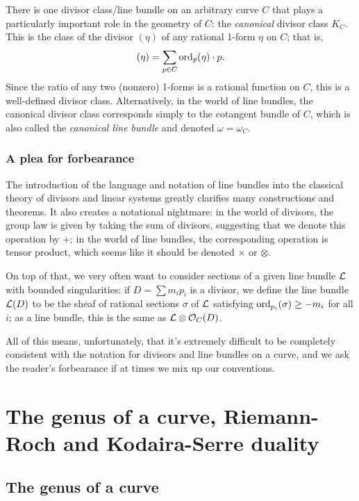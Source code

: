 \documentclass[12pt, leqno]{book}
\def\cL{{\cal L}}
\begin{document}
There is one divisor class/line bundle on an arbitrary curve $C$ that plays a particularly important role in the geometry of $C$: the \emph{canonical} divisor class $K_C$. This is the class of the divisor $(\eta)$ of any rational 1-form $\eta$ on $C$; that is,
$$
(\eta) = \sum_{p \in C} \ord_p(\eta)\cdot p.
$$
Since the ratio of any two (nonzero) 1-forms is a rational function on $C$, this is a well-defined divisor class. Alternatively, in the world of line bundles, the canonical divisor class corresponds simply to the cotangent bundle of $C$, which is also called the \emph{canonical line bundle} and denoted $\omega = \omega_C$.

\subsubsection{A plea for forbearance} 

The introduction of the language and notation of line bundles into the classical theory of divisors and linear systems greatly clarifies many constructions and theorems. It also creates a notational nightmare: in the world of divisors, the group law is given by taking the sum of divisors, suggesting that we denote this operation by $+$; in the world of line bundles, the corresponding operation is tensor product, which seems like it should be denoted $\times$ or $\otimes$.

On top of that, we very often want to consider sections of a given line bundle $\cL$ with bounded singularities: if $D = \sum m_ip_i$ is a divisor, we define the line bundle $\cL(D)$ to be the sheaf of rational sections $\sigma$ of $\cL$ satisfying $\ord_{p_i}(\sigma) \geq -m_i$ for all $i$; as a line bundle, this is the same as $\cL \otimes \cO_C(D)$.

All of this means, unfortunately, that it's extremely difficult to be completely consistent with the notation for divisors and line bundles on a curve, and we ask the reader's forbearance if at times we mix up our conventions.




\section{The genus of a curve, Riemann-Roch and Kodaira-Serre duality}

\subsection{The genus of a curve}
\end{document}
